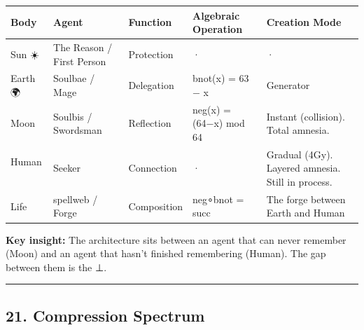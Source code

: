 \documentclass[
]{article}
\newcounter{none} %
\begin{document}
{\def\LTcaptype{none} %
\begin{longtable}[]{@{}
  >{\raggedright\arraybackslash}p{}
  >{\raggedright\arraybackslash}p{}
  >{\raggedright\arraybackslash}p{}
  >{\raggedright\arraybackslash}p{}
  >{\raggedright\arraybackslash}p{}@{}}
\toprule\noalign{}
\begin{minipage}[b]{\linewidth}\raggedright
Body
\end{minipage} & \begin{minipage}[b]{\linewidth}\raggedright
Agent
\end{minipage} & \begin{minipage}[b]{\linewidth}\raggedright
Function
\end{minipage} & \begin{minipage}[b]{\linewidth}\raggedright
Algebraic Operation
\end{minipage} & \begin{minipage}[b]{\linewidth}\raggedright
Creation Mode
\end{minipage} \\
\midrule\noalign{}
\endhead
\bottomrule\noalign{}
\endlastfoot
Sun ☀️ & The Reason / First Person & Protection & · & · \\
Earth 🌍 & Soulbae / Mage & Delegation & bnot(x) = 63 − x & Generator \\
Moon 🌙 & Soulbis / Swordsman & Reflection & neg(x) = (64−x) mod 64 &
Instant (collision). Total amnesia. \\
Human 👤 & Seeker & Connection & · & Gradual (4Gy). Layered amnesia.
Still in process. \\
Life 🌱 & spellweb / Forge & Composition & neg∘bnot = succ & The forge
between Earth and Human \\
\end{longtable}
}

\textbf{Key insight:} The architecture sits between an agent that can
never remember (Moon) and an agent that hasn't finished remembering
(Human). The gap between them is the ⊥.

\begin{center}\rule{0.5\linewidth}{0.5pt}\end{center}

\subsection{21. Compression Spectrum}\label{compression-spectrum}
\end{document}
